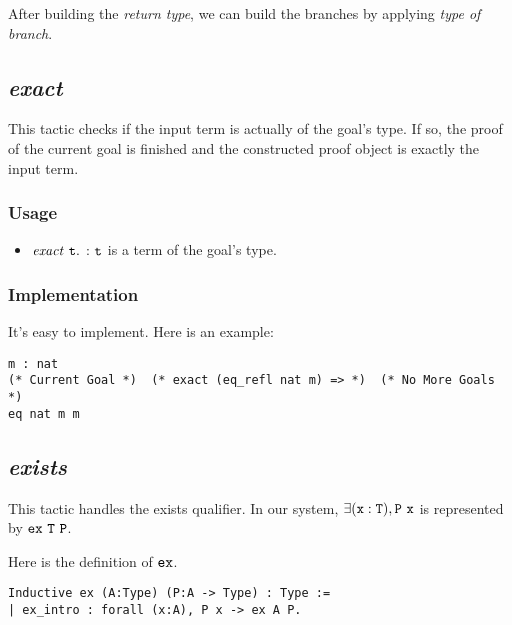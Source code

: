 After building the {\it return type}, we can build the branches by applying {\it type of branch}.

\subsection{\it exact}

This tactic checks if the input term is actually of the goal's type. If so, the proof of the current goal is finished and the 
constructed proof object is exactly the input term.

\subsubsection*{Usage}
\begin{itemize}
\item ${\it exact}\ \tt t.$ : $\tt t$ is a term of the goal's type. 
\end{itemize}

\subsubsection*{Implementation}
It's easy to implement. Here is an example:
\begin{center}
\begin{minipage}{0.8\textwidth}
\begin{verbatim}
m : nat                                                      
(* Current Goal *)  (* exact (eq_refl nat m) => *)  (* No More Goals *)
eq nat m m                                       
\end{verbatim}
\end{minipage}
\end{center}

\subsection{\it exists}

This tactic handles the exists qualifier. In our system, $\tt\exists (x:T),P\ x$ is represented by $\tt ex\ T\ P$.

Here is the definition of $\tt ex$.
\begin{center}
\begin{minipage}{0.6\textwidth}
\begin{verbatim}
Inductive ex (A:Type) (P:A -> Type) : Type :=
| ex_intro : forall (x:A), P x -> ex A P.    
\end{verbatim}
\end{minipage}
\end{center}

